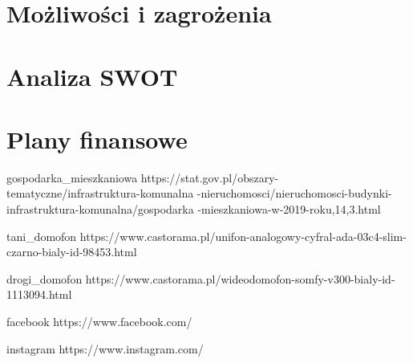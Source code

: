 \documentclass{classrep}
\begin{document}
{    \section{Możliwości i zagrożenia}
    \label{chapter7:mozliwosci_zagrozenia} {
        
    }

    \section{Analiza SWOT}
    \label{chapter8:analiza_swot} {
        
    }

    \section{Plany finansowe}
    \label{chapter9:plany_finansowe} {
        
    }

    \begin{thebibliography}{0}
        \bibitem
        {gospodarka_mieszkaniowa}
        {https://stat.gov.pl/obszary-tematyczne/infrastruktura-komunalna
        -nieruchomosci/nieruchomosci-budynki-infrastruktura-komunalna/gospodarka
        -mieszkaniowa-w-2019-roku,14,3.html}

        \bibitem
        {tani_domofon}
        {https://www.castorama.pl/unifon-analogowy-cyfral-ada-03c4-slim-czarno-bialy-id-98453.html}

        \bibitem
        {drogi_domofon}
        {https://www.castorama.pl/wideodomofon-somfy-v300-bialy-id-1113094.html}

        \bibitem
        {facebook}
        {https://www.facebook.com/}

        \bibitem
        {instagram}
        {https://www.instagram.com/}
    \end{thebibliography}
}
\end{document}
